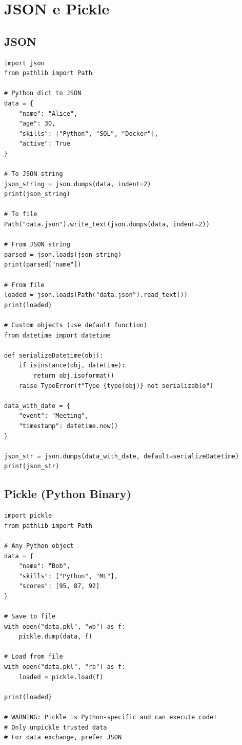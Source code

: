 \section{JSON e Pickle}

\subsection{JSON}

\begin{lstlisting}
import json
from pathlib import Path

# Python dict to JSON
data = {
    "name": "Alice",
    "age": 30,
    "skills": ["Python", "SQL", "Docker"],
    "active": True
}

# To JSON string
json_string = json.dumps(data, indent=2)
print(json_string)

# To file
Path("data.json").write_text(json.dumps(data, indent=2))

# From JSON string
parsed = json.loads(json_string)
print(parsed["name"])

# From file
loaded = json.loads(Path("data.json").read_text())
print(loaded)

# Custom objects (use default function)
from datetime import datetime

def serializeDatetime(obj):
    if isinstance(obj, datetime):
        return obj.isoformat()
    raise TypeError(f"Type {type(obj)} not serializable")

data_with_date = {
    "event": "Meeting",
    "timestamp": datetime.now()
}

json_str = json.dumps(data_with_date, default=serializeDatetime)
print(json_str)
\end{lstlisting}

\subsection{Pickle (Python Binary)}

\begin{lstlisting}
import pickle
from pathlib import Path

# Any Python object
data = {
    "name": "Bob",
    "skills": ["Python", "ML"],
    "scores": [95, 87, 92]
}

# Save to file
with open("data.pkl", "wb") as f:
    pickle.dump(data, f)

# Load from file
with open("data.pkl", "rb") as f:
    loaded = pickle.load(f)

print(loaded)

# WARNING: Pickle is Python-specific and can execute code!
# Only unpickle trusted data
# For data exchange, prefer JSON
\end{lstlisting}

